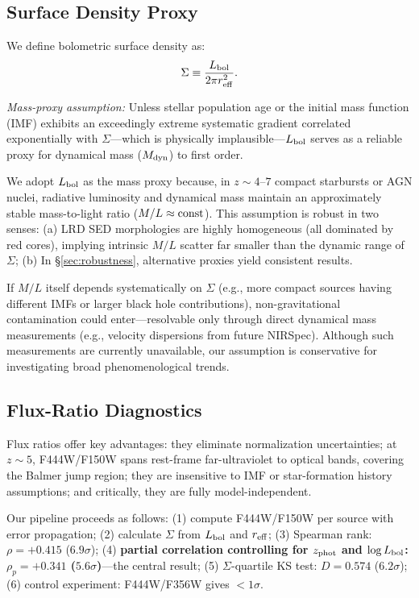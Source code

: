 \documentclass[apjl,twocolumn,longbibliography,linenumbers]{aastex701}
\begin{document}
\subsection{Surface Density Proxy}
\label{sec:sigma}

We define bolometric surface density as:
\begin{equation}
\Sigma \equiv \frac{L_{\rm bol}}{2\pi r_{\rm eff}^2}.
\end{equation}

\noindent\textit{Mass-proxy assumption:}
Unless stellar population age or the initial mass function (IMF)
exhibits an exceedingly extreme systematic gradient correlated exponentially
with $\Sigma$---which is physically implausible---$L_{\rm bol}$ serves as a
reliable proxy for dynamical mass ($M_{\rm dyn}$) to first order.

We adopt $L_{\rm bol}$ as the mass proxy because, in $z \sim 4$--$7$ compact
starbursts or AGN nuclei, radiative luminosity and dynamical mass maintain an
approximately stable mass-to-light ratio ($M/L \approx {\rm const}$).
This assumption is robust in two senses:
(a) LRD SED morphologies are highly homogeneous (all dominated by red cores),
implying intrinsic $M/L$ scatter far smaller than the dynamic range of $\Sigma$;
(b) In \S\ref{sec:robustness}, alternative proxies yield consistent results.

If $M/L$ itself depends systematically on $\Sigma$ (e.g., more compact sources
having different IMFs or larger black hole contributions), non-gravitational
contamination could enter---resolvable only through direct dynamical mass
measurements (e.g., velocity dispersions from future NIRSpec).
Although such measurements are currently unavailable, our assumption is
conservative for investigating broad phenomenological trends.

\subsection{Flux-Ratio Diagnostics}

Flux ratios offer key advantages:
they eliminate normalization uncertainties;
at $z \sim 5$, F444W/F150W spans rest-frame far-ultraviolet to optical bands,
covering the Balmer jump region;
they are insensitive to IMF or star-formation history assumptions;
and critically, they are fully model-independent.

Our pipeline proceeds as follows:
(1) compute F444W/F150W per source with error propagation;
(2) calculate $\Sigma$ from $L_{\rm bol}$ and $r_{\rm eff}$;
(3) Spearman rank: $\rho = +0.415$ ($6.9\sigma$);
(4) \textbf{partial correlation controlling for $z_{\rm phot}$ and $\log L_{\rm bol}$:
$\rho_p = +0.341$ ($5.6\sigma$)}---the central result;
(5) $\Sigma$-quartile KS test: $D = 0.574$ ($6.2\sigma$);
(6) control experiment: F444W/F356W gives $<1\sigma$.
\end{document}
